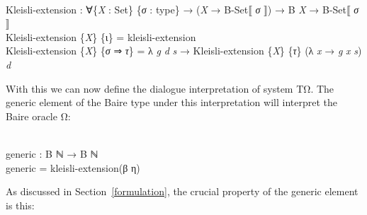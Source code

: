 \documentclass{entcs} \usepackage{prentcsmacro}
\newcommand{\AgdaC}[1]{\mbox{#1}}
\newcommand{\AgdaFontStyle}[1]{\textsf{#1}}
\newcommand{\AgdaBoundFontStyle}[1]{\textit{#1}}
\newcommand{\AgdaSymbol}      [1]{\textcolor{AgdaSymbol}{#1}}
\newcommand{\AgdaPrimitiveType}[1]
    {\AgdaFontStyle{\textcolor{AgdaPrimitiveType}{#1}}}
\newcommand{\AgdaBound}    [1]{\AgdaBoundFontStyle{\textcolor{AgdaBound}{#1}}}
\newcommand{\AgdaInductiveConstructor}[1]
    {\AgdaFontStyle{\textcolor{AgdaInductiveConstructor}{#1}}}
\newcommand{\AgdaDatatype} [1]{\AgdaFontStyle{\textcolor{AgdaDatatype}{#1}}}
\newcommand{\AgdaFunction} [1]{\AgdaFontStyle{\textcolor{AgdaFunction}{#1}}}
\newcommand{\AgdaCodeStyle}{\small}
\newenvironment{code}%
{\noindent\AgdaCodeStyle\pboxed}%
{\endpboxed\par\noindent%
\ignorespacesafterend}
\begin{document}
\begin{code}\>\<%
\\
\>\AgdaFunction{Kleisli-extension} \AgdaSymbol{:} \AgdaSymbol{∀\{}\AgdaBound{X} \AgdaSymbol{:} \AgdaPrimitiveType{Set}\AgdaSymbol{\}} \AgdaSymbol{\{}\AgdaBound{σ} \AgdaSymbol{:} \AgdaDatatype{type}\AgdaSymbol{\}} \AgdaSymbol{→} \AgdaSymbol{(}\AgdaBound{X} \AgdaSymbol{→} \AgdaFunction{B-Set⟦} \AgdaBound{σ} \AgdaFunction{⟧}\AgdaSymbol{)} \AgdaSymbol{→} \AgdaFunction{B} \AgdaBound{X} \AgdaSymbol{→} \AgdaFunction{B-Set⟦} \AgdaBound{σ} \AgdaFunction{⟧}\<%
\\
\>\AgdaFunction{Kleisli-extension} \AgdaSymbol{\{}\AgdaBound{X}\AgdaSymbol{\}} \AgdaSymbol{\{}\AgdaInductiveConstructor{ι}\AgdaSymbol{\}} \AgdaSymbol{=} \AgdaFunction{kleisli-extension}\<%
\\
\>\AgdaFunction{Kleisli-extension} \AgdaSymbol{\{}\AgdaBound{X}\AgdaSymbol{\}} \AgdaSymbol{\{}\AgdaBound{σ} \AgdaInductiveConstructor{⇒} \AgdaBound{τ}\AgdaSymbol{\}} \AgdaSymbol{=} \AgdaSymbol{λ} \AgdaBound{g} \AgdaBound{d} \AgdaBound{s} \AgdaSymbol{→} \AgdaFunction{Kleisli-extension} \AgdaSymbol{\{}\AgdaBound{X}\AgdaSymbol{\}} \AgdaSymbol{\{}\AgdaBound{τ}\AgdaSymbol{\}} \AgdaSymbol{(λ} \AgdaBound{x} \AgdaSymbol{→} \AgdaBound{g} \AgdaBound{x} \AgdaBound{s}\AgdaSymbol{)} \AgdaBound{d} \<[84]%
\>[84]\<%
\\
\>\<\end{code}
With this we can now define the dialogue interpretation of system TΩ.
The generic element of the Baire type under this 
interpretation will interpret the Baire oracle Ω:

\begin{code}\>\<%
\\
\>\AgdaFunction{generic} \AgdaSymbol{:} \AgdaFunction{B} \AgdaDatatype{ℕ} \AgdaSymbol{→} \AgdaFunction{B} \AgdaDatatype{ℕ}\<%
\\
\>\AgdaFunction{generic} \AgdaSymbol{=} \AgdaFunction{kleisli-extension}\AgdaSymbol{(}\AgdaInductiveConstructor{β} \AgdaInductiveConstructor{η}\AgdaSymbol{)}\<%
\\
\>\<\end{code}
As discussed in Section~\ref{formulation},
the crucial property of the generic element is this:
%
\end{document}
